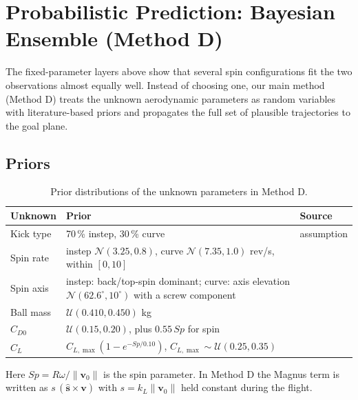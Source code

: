 \documentclass[11pt,a4paper]{article}
\begin{document}
\section{Probabilistic Prediction: Bayesian Ensemble (Method D)}
\label{sec:methodD}
The fixed-parameter layers above show that several spin configurations fit the two observations almost equally well. Instead of choosing one, our main method (Method D) treats the unknown aerodynamic parameters as random variables with literature-based priors and propagates the full set of plausible trajectories to the goal plane.

\subsection{Priors}
\begin{table}[H]
\centering
\caption{Prior distributions of the unknown parameters in Method D.}
\label{tab:priors}
\small
\begin{tabularx}{\linewidth}{@{}lXl@{}}
\toprule
Unknown & Prior & Source\\
\midrule
Kick type & 70\,\% instep, 30\,\% curve & assumption\\
Spin rate & instep $\mathcal N(3.25,0.8)$, curve $\mathcal N(7.35,1.0)$ rev/s, within $[0,10]$ & \citet{tsukada,asai2007}\\
Spin axis & instep: back/top-spin dominant; curve: axis elevation $\mathcal N(62.6^\circ,10^\circ)$ with a screw component & \citet{whiteside,tsukada}\\
Ball mass & $\mathcal U(0.410,0.450)$ kg & \citet{ifab}\\
$C_{D0}$ & $\mathcal U(0.15,0.20)$, plus $0.55\,Sp$ for spin & \citet{asai2007,goff2009}\\
$C_{L}$ & $C_{L,\max}(1-e^{-Sp/0.10})$, $C_{L,\max}\sim\mathcal U(0.25,0.35)$ & \citet{carre2002,goff2012}\\
\bottomrule
\end{tabularx}
\end{table}
Here $Sp=R\omega/\|\bm v_0\|$ is the spin parameter. In Method D the Magnus term is written as $s\,(\hat{\bm s}\times\bm v)$ with $s=k_L\|\bm v_0\|$ held constant during the flight.
\end{document}
